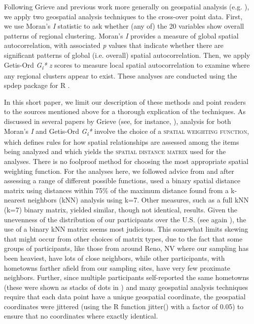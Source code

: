 \documentclass[output=paper]{LSP/langsci}
\begin{document}
Following Grieve \citep{grieve_corpus-based_2009,grieve_statistical_2011,grieve_multivariate_2013} and previous work more generally on geospatial analysis (e.g. \citealt{moran_notes_1950,ord_local_1995}), we apply two geospatial analysis techniques to the cross-over point data. First, we use Moran’s \textit{I} statistic to ask whether (any of) the 20 variables show overall patterns of regional clustering. Moran’s \textit{I }provides a measure of global spatial autocorrelation, with associated \textit{p} values that indicate whether there are significant patterns of global (i.e. overall) spatial autocorrelation. Then, we apply Getis-Ord \textit{G}\textit{\textsubscript{i}}\textit{*} \textit{z }scores to measure local spatial autocorrelation to examine where any regional clusters appear to exist. These analyses are conducted using the spdep package for R \citep{bivand_spdep._2014}.

In this short paper, we limit our description of these methods and point readers to the sources mentioned above for a thorough explication of the techniques. As discussed in several papers by Grieve (see, for instance, \citealt{grieve_comparison_2014}), analysis for both Moran’s \textit{I} and Getis-Ord \textit{G}\textit{\textsubscript{i}}\textit{*} involve the choice of a \textsc{spatial weighting function}, which defines rules for how spatial relationships are assessed among the items being analyzed and which yields the \textsc{spatial distance matrix} used for the analyses. There is no foolproof method for choosing the most appropriate spatial weighting function. For the analyses here, we followed advice from \citet{bivand_creating_2014} and after assessing a range of different possible functions, used a binary spatial distance matrix using distances within 75\% of the maximum distance found from a k-nearest neighbors (kNN) analysis using k=7. Other measures, such as a full kNN (k=7) binary matrix, yielded similar, though not identical, results. Given the unevenness of the distribution of our participants over the U.S. (see again ), the use of a binary kNN matrix seems most judicious. This somewhat limits skewing that might occur from other choices of matrix types, due to the fact that some groups of participants, like those from around Reno, NV where our sampling has been heaviest, have lots of close neighbors, while other participants, with hometowns farther afield from our sampling sites, have very few proximate neighbors. Further, since multiple participants self-reported the same hometowns (these were shown as stacks of dots in ) and many geospatial analysis techniques require that each data point have a unique geospatial coordinate, the geospatial coordinates were jittered (using the R function jitter() with a factor of 0.05) to ensure that no coordinates where exactly identical.
\end{document}
